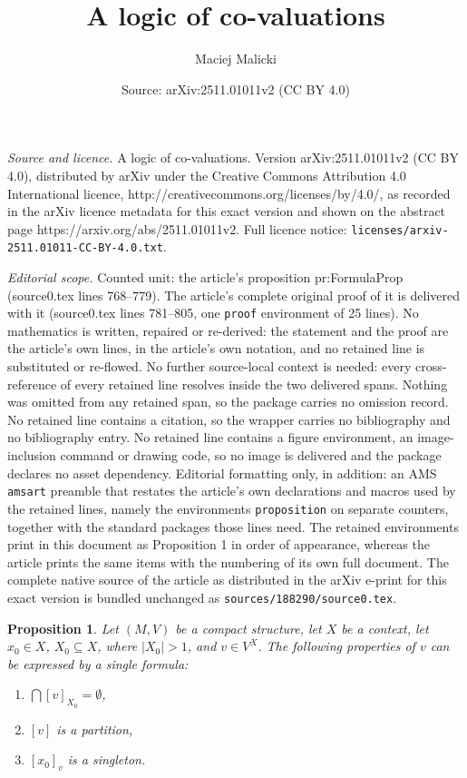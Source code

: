 \documentclass[10pt,a4paper]{amsart}
\title{A logic of co-valuations}
\author{Maciej Malicki}
\date{Source: arXiv:2511.01011v2 (CC BY 4.0)}
\newtheorem{proposition}{Proposition}
\newcommand \PPb{\mathbb{P}}
\begin{document}
\maketitle

\noindent\emph{Source and licence.} A logic of co-valuations. Version arXiv:2511.01011v2 (CC BY 4.0), distributed by arXiv under the Creative Commons Attribution 4.0 International licence, http://creativecommons.org/licenses/by/4.0/, as recorded in the arXiv licence metadata for this exact version and shown on the abstract page https://arxiv.org/abs/2511.01011v2. Full licence notice: \texttt{licenses/arxiv-2511.01011-CC-BY-4.0.txt}.\par\smallskip

\noindent\textit{Editorial scope.} Counted unit: the article's proposition pr:FormulaProp (source0.tex lines 768--779). The article's complete original proof of it is delivered with it (source0.tex lines 781--805, one \texttt{proof} environment of 25 lines). No mathematics is written, repaired or re-derived: the statement and the proof are the article's own lines, in the article's own notation, and no retained line is substituted or re-flowed.  No further source-local context is needed: every cross-reference of every retained line resolves inside the two delivered spans.  Nothing was omitted from any retained span, so the package carries no omission record.  No retained line contains a citation, so the wrapper carries no bibliography and no bibliography entry.  No retained line contains a figure environment, an image-inclusion command or drawing code, so no image is delivered and the package declares no asset dependency.  Editorial formatting only, in addition: an AMS \texttt{amsart} preamble that restates the article's own declarations and macros used by the retained lines, namely the environments \texttt{proposition} on separate counters, together with the standard packages those lines need.  The retained environments print in this document as Proposition 1 in order of appearance, whereas the article prints the same items with the numbering of its own full document.  The complete native source of the article as distributed in the arXiv e-print for this exact version is bundled unchanged as \texttt{sources/188290/source0.tex}.
\begin{proposition}
	\label{pr:FormulaProp}	
	Let $(M,V)$ be a compact structure, let $X$ be a context, let $x_0 \in X$, $X_0 \subseteq X$, where $|X_0|>1$,  and $v \in V^X$. The following properties of $v$ can be expressed by a single formula:
	
	\begin{enumerate}
		\item $\bigcap [v]_{X_0}= \emptyset$, 
		\item $[v]$ is a partition,
		\item $[x_0]_v$ is a singleton.
	\end{enumerate}
\end{proposition}		
\end{document}
